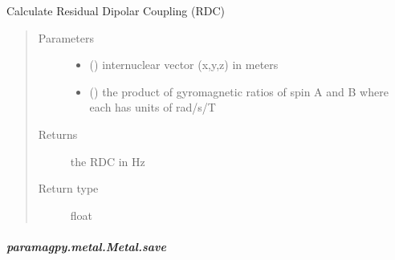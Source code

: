 \documentclass[a4paper,10pt,english,openany,oneside]{sphinxmanual}
\begin{document}
\begin{fulllineitems}
\begin{fulllineitems}
\begin{fulllineitems}
\label{\detokenize{reference/generated/paramagpy.metal.Metal.rdc:paramagpy.metal.Metal.rdc}}
\sphinxAtStartPar
Calculate Residual Dipolar Coupling (RDC)
\begin{quote}\begin{description}
\item[{Parameters}] \leavevmode\begin{itemize}
\item {} 
\sphinxAtStartPar
{} () \textendash{} internuclear vector (x,y,z) in meters

\item {} 
\sphinxAtStartPar
{} () \textendash{} the product of gyromagnetic ratios of spin A and B
where each has units of rad/s/T

\end{itemize}

\item[{Returns}] \leavevmode
\sphinxAtStartPar
{} \textendash{} the RDC in Hz

\item[{Return type}] \leavevmode
\sphinxAtStartPar
float

\end{description}\end{quote}

\end{fulllineitems}



\subparagraph{paramagpy.metal.Metal.save}
\label{\detokenize{reference/generated/paramagpy.metal.Metal.save:paramagpy-metal-metal-save}}\label{\detokenize{reference/generated/paramagpy.metal.Metal.save::doc}}

\begin{fulllineitems}
\label{\detokenize{reference/generated/paramagpy.metal.Metal.save:paramagpy.metal.Metal.save}}
\end{fulllineitems}




\end{fulllineitems}
\end{fulllineitems}
\end{document}
